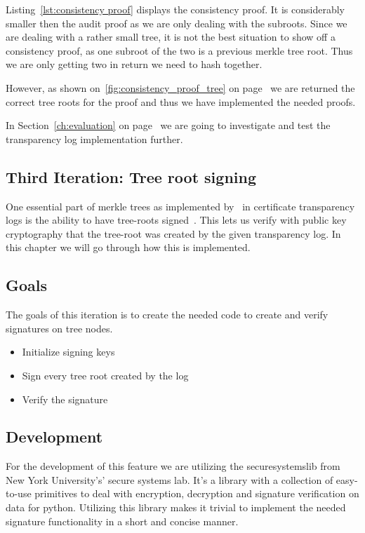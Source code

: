 \documentclass[../Main/thesis.tex]{subfiles}
\begin{document}
Listing~\ref{lst:consistency proof} displays the consistency proof. It is
considerably smaller then the audit proof as we are only dealing with the
subroots. Since we are dealing with a rather small tree, it is not the best
situation to show off a consistency proof, as one subroot of the two is a
previous merkle tree root. Thus we are only getting two in return we need to
hash together. 

However, as shown on~\ref{fig:consistency_proof_tree} on
page~\pageref{fig:consistency_proof_tree} we are returned the correct tree roots
for the proof and thus we have implemented the needed proofs.

In Section~\ref{ch:evaluation} on page~\pageref{ch:evaluation} we are going to
investigate and test the transparency log implementation further.

\subsection{Third Iteration: Tree root signing}%
\label{sub:tree_root_signing}
One essential part of merkle trees as implemented
by~\citeauthor{b.-laurie-a.-langley-e.kaster-google-2013} in certificate
transparency logs is the ability to have tree-roots
signed~\cite{b.-laurie-a.-langley-e.kaster-google-2013}. This lets us verify
with public key cryptography that the tree-root was created by the given
transparency log. In this chapter we will go through how this is implemented.

\subsection*{Goals}%
\label{sub:third_iteration_goals}

The goals of this iteration is to create the needed code to create and verify
signatures on tree nodes.

\begin{itemize}
    \item Initialize signing keys
    \item Sign every tree root created by the log
    \item Verify the signature
\end{itemize}

\subsection*{Development}%
\label{sub:third_iteration_development}
For the development of this feature we are utilizing the securesystemslib from
New York University's' secure systems lab. It's a library with a collection of
easy-to-use primitives to deal with encryption, decryption and signature
verification on data for python. Utilizing this library makes it trivial to
implement the needed signature functionality in a short and concise manner.
\end{document}
